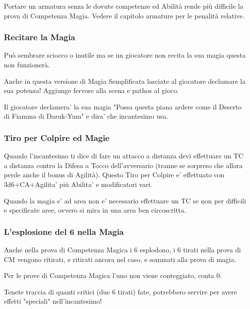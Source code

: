 \begin{multicols}{2}
Portare un armatura senza le dovute competenze ed Abilità rende più difficile la prova di Competenza Magia. Vedere il capitolo armature per le penalità relative.

\subsubsection{Recitare la Magia}

Può sembrare sciocco o inutile ma se un giocatore non recita la sua magia questa non funzionerà.

Anche in questa versione di Magia Semplificata lasciate al giocatore declamare la sua potenza!
Aggiunge fervore alla scena e pathos al gioco.

Il giocatore declamera' la sua magia "Possa questa piana ardere come il Deserto di Fiamma di Daruk-Yum" e dira' che incantesimo usa.

\subsubsection{Tiro per Colpire ed Magie}

Quando l'incantesimo ti dice di fare un attacco a distanza devi effettuare un TC a distanza contro la Difesa a Tocco dell'avversario (tranne se sorpreso che allora perde anche il bonus di Agilità). Questo Tiro per Colpire e' effettuato con 3d6+CA+Agilita' più Abilita' e modificatori vari.

Quando la magia e' ad area non e' necessario effettuare un TC se non per difficili e specificate aree, ovvero si mira in una area ben circoscritta.

\subsubsection{L'esplosione del 6 nella Magia}

\label{lesplosione-del-6-nella-magia}

Anche nella prova di Competenza Magica i 6 esplodono, i 6 tirati nella prova di CM vengono ritirati, e ritirati ancora nel caso, e sommati alla prova di magia.

Per le prove di Competenza Magica l'uno non viene conteggiato, conta 0.

Tenete traccia di quanti critici (due 6 tirati) fate, potrebbero servire per avere effetti "speciali" nell'incantesimo!


\end{multicols}

